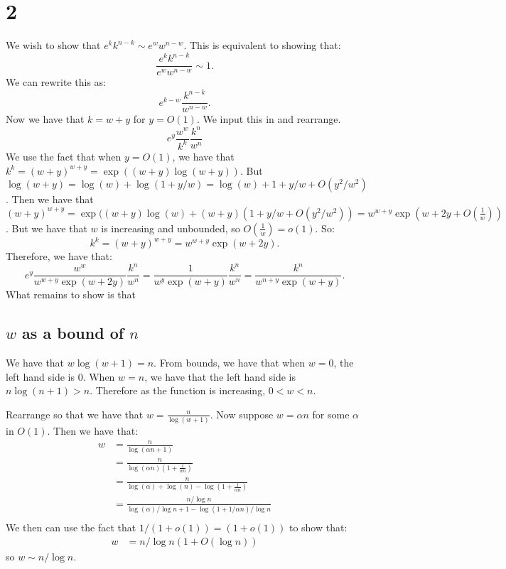\documentclass[]{article}
\begin{document}
\section{2}
We wish to show that $e^k k^{n - k} \sim e^w w^{n - w}$. This is equivalent to showing that:
\begin{equation}
	\frac{e^k k^{n - k}}{e^w w^{n - w}} \sim 1.
\end{equation}
We can rewrite this as:
\begin{equation}
	e^{k - w} \frac{k^{n - k}}{w^{n - w}}.
\end{equation}
Now we have that $k = w + y$ for $y = O(1)$. We input this in and rearrange.
\begin{equation}
	e^{y} \frac{w^w}{k^k} \frac{k^n}{w^n} 
\end{equation}
We use the fact that when $y = O(1)$, we have that $k^k = (w + y)^{w + y} = \exp((w + y) \log(w + y))$. But $\log(w + y) = \log(w) + \log(1 + y/w) = \log(w) + 1 + y/w + O(y^2/w^2)$. Then we have that $(w + y)^{w + y}  = \exp((w + y) \log(w) + (w + y) (1 + y/w + O(y^2/w^2)) = w^{w + y} \exp(w + 2y + O(\frac{1}{w}))$. But we have that $w$ is increasing and unbounded, so $O(\frac{1}{w}) = o(1)$. So:
\begin{equation}
	k^k = (w + y)^{w + y}  = w^{w + y} \exp(w + 2y).
\end{equation}
Therefore, we have that:
\begin{equation}
	e^{y} \frac{w^w}{w^{w + y}\exp(w + 2y)} \frac{k^n}{w^n} = \frac{1}{w^y \exp(w + y)} \frac{k^n}{w^n} = \frac{k^n}{w^{n + y} \exp(w + y)}.
\end{equation}
What remains to show is that 

\subsection{$w$ as a bound of $n$}
We have that $w \log (w + 1) = n$. 
From bounds, we have that when $w = 0$, the left hand side is $0$. When $w = n$, we have that the left hand side is $n \log(n + 1) > n$. Therefore as the function is increasing, $0 < w < n$. 

Rearrange so that we have that $w = \frac{n}{\log(w + 1)}$. Now suppose $w = \alpha n$ for some $\alpha$ in $O(1)$. Then we have that:
\begin{align*}
	w &= \frac{n}{\log(\alpha n + 1)}\\
	&= \frac{n}{\log(\alpha n) (1 + \frac{1}{\alpha n})}\\
	&=\frac{n}{\log(\alpha) + \log(n) - \log(1 + \frac{1}{\alpha n})}\\
	&= \frac{n/ \log n}{\log(\alpha)/\log n + 1 - \log(1 + 1/\alpha n)/\log n}\\
\end{align*}
We then can use the fact that $1/(1 + o(1)) = (1 + o(1))$ to show that:
\begin{align*}
	w &= n / \log n (1 + O(\log n))
\end{align*}
so $w \sim n / \log n$. 
\end{document}
